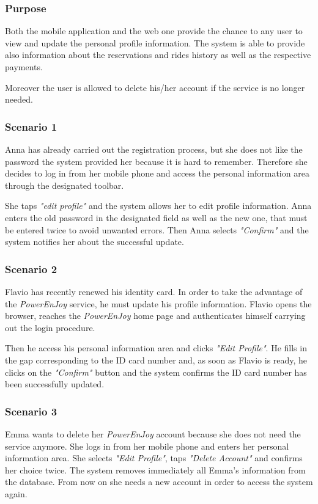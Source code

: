 \subsubsection{Purpose}
Both the mobile application and the web one provide the chance to any user to view and update the personal profile information. The system is able to provide also information about the reservations and rides history as well as the respective payments.

Moreover the user is allowed to delete his/her account if the service is no longer needed.

\subsubsection{Scenario 1}
Anna has already carried out the registration process, but she does not like the password the system provided her because it is hard to remember. Therefore she decides to log in from her mobile phone and access the personal information area through the designated toolbar.

She taps \emph{"edit profile"} and the system allows her to edit profile information. Anna enters the old password in the designated field as well as the new one, that must be entered twice to avoid unwanted errors. Then Anna selects \emph{"Confirm"} and the system notifies her about the successful update.

\subsubsection{Scenario 2}
Flavio has recently renewed his identity card. In order to take the advantage of the \emph{PowerEnJoy} service, he must update his profile information. Flavio opens the browser, reaches the \emph{PowerEnJoy} home page and authenticates himself carrying out the login procedure. 

Then he access his personal information area and clicks \emph{"Edit Profile"}. He fills in the gap corresponding to the ID card number and, as soon as Flavio is ready, he clicks on the \emph{"Confirm"} button and the system confirms the ID card number has been successfully updated.

\subsubsection{Scenario 3}
Emma wants to delete her \emph{PowerEnJoy} account because she does not need the service anymore. She logs in from her mobile phone and enters her personal information area. She selects \emph{"Edit Profile"}, taps \emph{"Delete Account"} and confirms her choice twice. The system removes immediately all Emma's information from the database. From now on she needs a new account in order to access the system again.

